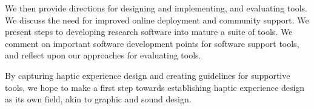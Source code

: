 We then provide directions for designing and implementing, and evaluating \haxd tools.
We discuss the need for improved online deployment and community support.
We present steps to developing research software into mature a \haxd suite of tools.
We comment on important software development points for software support tools, and reflect upon our approaches for evaluating \haxd tools.

By capturing haptic experience design and creating guidelines for supportive tools, we hope to make a first step towards establishing haptic experience design as its own field, akin to graphic and sound design.


\vfill
\begin{center}
\begin{sf}
\end{sf}
\end{center}
